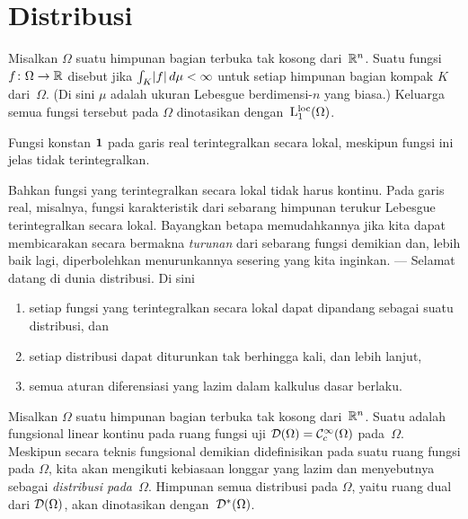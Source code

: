 \section{Distribusi}
\begin{defn} Misalkan $\Omega$ suatu himpunan bagian terbuka tak kosong dari~$\mathbb{R}^n$. Suatu fungsi $f\colon \Omega \rightarrow \mathbb{R}$ disebut
 jika $\int_K \lvert f\rvert\,d\mu < \infty$ untuk setiap himpunan bagian kompak $K$ dari~$\Omega$. (Di sini $\mu$ adalah ukuran Lebesgue
berdimensi-$n$ yang biasa.) Keluarga semua fungsi tersebut pada $\Omega$ dinotasikan
dengan~$\mathrm{L_1^{loc}}({\Omega})$.
\end{defn}

\begin{exam} Fungsi konstan $\mathbf{1}$ pada garis real terintegralkan secara lokal, meskipun fungsi ini jelas tidak terintegralkan.
\end{exam}

Bahkan fungsi yang terintegralkan secara lokal tidak harus kontinu. Pada garis real, misalnya, fungsi karakteristik dari sebarang himpunan terukur Lebesgue
terintegralkan secara lokal. Bayangkan betapa memudahkannya jika kita dapat membicarakan secara bermakna \emph{turunan} dari sebarang fungsi demikian dan,
lebih baik lagi, diperbolehkan menurunkannya sesering yang kita inginkan. --- Selamat datang di dunia distribusi. Di sini
   \begin{enumerate}
       \item setiap fungsi yang terintegralkan secara lokal dapat dipandang sebagai suatu distribusi, dan
       \item setiap distribusi dapat diturunkan tak berhingga kali, dan lebih lanjut,
       \item semua aturan diferensiasi yang lazim dalam kalkulus dasar berlaku.
   \end{enumerate}

\begin{defn} Misalkan $\Omega$ suatu himpunan bagian terbuka tak kosong dari~$\mathbb{R}^n$. Suatu
 adalah fungsional linear kontinu pada ruang fungsi uji $\mathcal{D}(\Omega) = \mathcal{C}^\infty_c(\Omega)$ pada~$\Omega$.
Meskipun secara teknis fungsional demikian didefinisikan pada suatu ruang fungsi pada $\Omega$, kita akan mengikuti kebiasaan longgar yang lazim
dan menyebutnya sebagai \emph{distribusi pada~$\Omega$}. Himpunan semua distribusi pada $\Omega$, yaitu ruang dual dari $\mathcal{D}(\Omega)$,
akan dinotasikan dengan~$\mathcal{D}^*(\Omega)$.
\end{defn}


